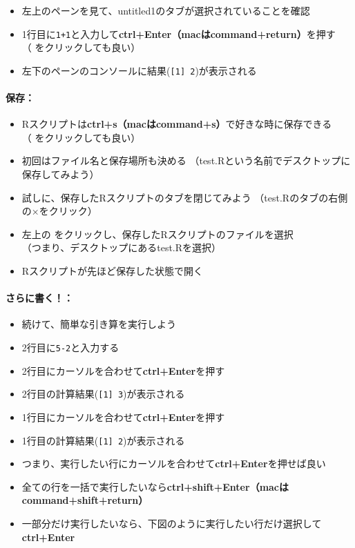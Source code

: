 \documentclass[
]{book}
\providecommand{\tightlist}{%
  \setlength{\itemsep}{0pt}\setlength{\parskip}{0pt}}
\begin{document}
\begin{itemize}
\tightlist
\item
  左上のペーンを見て、untitled1のタブが選択されていることを確認
\item
  1行目に\texttt{1+1}と入力して\textbf{ctrl+Enter（macはcommand+return）}を押す\\
  （ をクリックしても良い）
\item
  左下のペーンのコンソールに結果(\texttt{{[}1{]}\ 2})が表示される
\end{itemize}

\hypertarget{ux4fddux5b58}{%
\paragraph*{保存：}\label{ux4fddux5b58}}

\begin{itemize}
\tightlist
\item
  Rスクリプトは\textbf{ctrl+s（macはcommand+s）}で好きな時に保存できる\\
  （ をクリックしても良い）
\item
  初回はファイル名と保存場所も決める
  （test.Rという名前でデスクトップに保存してみよう）
\item
  試しに、保存したRスクリプトのタブを閉じてみよう
  （test.Rのタブの右側の×をクリック）
\item
  左上の をクリックし、保存したRスクリプトのファイルを選択\\
  （つまり、デスクトップにあるtest.Rを選択）
\item
  Rスクリプトが先ほど保存した状態で開く
\end{itemize}

\hypertarget{ux3055ux3089ux306bux66f8ux304f}{%
\paragraph*{さらに書く！：}\label{ux3055ux3089ux306bux66f8ux304f}}

\begin{itemize}
\tightlist
\item
  続けて、簡単な引き算を実行しよう
\item
  2行目に\texttt{5-2}と入力する
\item
  2行目にカーソルを合わせて\textbf{ctrl+Enter}を押す
\item
  2行目の計算結果(\texttt{{[}1{]}\ 3})が表示される
\item
  1行目にカーソルを合わせて\textbf{ctrl+Enter}を押す
\item
  1行目の計算結果(\texttt{{[}1{]}\ 2})が表示される
\item
  つまり、実行したい行にカーソルを合わせて\textbf{ctrl+Enter}を押せば良い
\item
  全ての行を一括で実行したいなら\textbf{ctrl+shift+Enter（macはcommand+shift+return）}
\item
  一部分だけ実行したいなら、下図のように実行したい行だけ選択して\textbf{ctrl+Enter}
\end{itemize}
\end{document}
